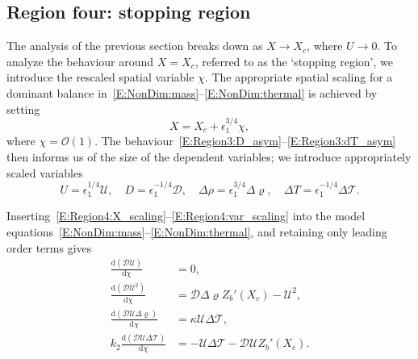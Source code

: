 \documentclass[openacc]{rsproca_new}%
\newcommand{\dd}[2]{\frac{\mathrm{d} #1}{\mathrm{d} #2}}
\newcommand{\order}[1]{\mathcal{O}(#1)}
\newcommand{\epsone}{\epsilon_{1}} %
\begin{document}


\subsection{Region four: stopping region}\label{S:Asymptotics:Region4}
\newcommand{\U}{\mathcal{U}}
\newcommand{\D}{\mathcal{D}}
\newcommand{\p}{\Delta \varrho}
\renewcommand{\t}{\Delta \mathcal{T}}

The analysis of the previous section breaks down as $X \to X_c$, where $U \to 0$. To analyze the behaviour around $X = X_c$, referred to as the `stopping region', we introduce the rescaled spatial variable $\chi$. The appropriate spatial scaling for a dominant balance in~\eqref{E:NonDim:mass}--\eqref{E:NonDim:thermal} is achieved by setting 
\begin{equation}\label{E:Region4:X_scaling}
X = X_c + \epsone^{3/4}\chi,
\end{equation}
where $\chi = \order{1}$. The behaviour~\eqref{E:Region3:D_asym}--\eqref{E:Region3:dT_asym} then informs us of the size of the dependent variables; we introduce appropriately scaled variables
\begin{equation}\label{E:Region4:var_scaling}
U = \epsone^{1/4}\U, \quad D = \epsone^{-1/4}\D, \quad \Delta \rho = \epsone^{3/4}\p, \quad  \Delta T = \epsone^{-1/4} \t.
\end{equation}

Inserting~\eqref{E:Region4:X_scaling}--\eqref{E:Region4:var_scaling} into the model equations~\eqref{E:NonDim:mass}--\eqref{E:NonDim:thermal}, and retaining only leading order terms gives
\begin{align}
\dd{(\D\U)}{\chi} &=0,\label{E:Region4:mass_scaled}\\
\dd{(\D \U^2)}{\chi} &=  \D \p Z_b'(X_c) -\U^2,\label{E:Region4:mom_scaled}\\
\dd{(\D\U\p)}{\chi} &=\kappa  \U\t,\label{E:Region4:buoyancy_scaled}\\
k_2 \dd{(\D \U \t)}{\chi} &=- \U \t - \D \U Z_b'(X_c).\label{E:Region4:thermal_scaled}
\end{align}
\end{document}
